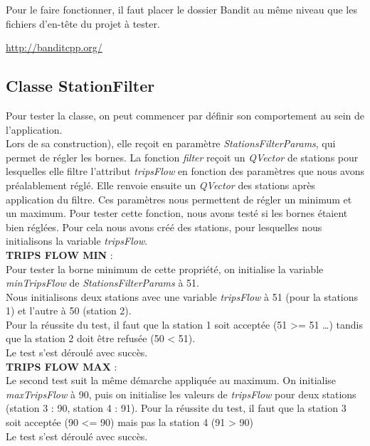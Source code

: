 \documentclass[12pt]{article}
\begin{document}
	Pour le faire fonctionner, il faut placer le dossier Bandit au même niveau que les fichiers d’en-tête du projet à tester.

	\url{http://banditcpp.org/}
	
		\subsection{Classe StationFilter}
		Pour tester la classe, on peut commencer par définir son comportement au sein de l’application.\\

		Lors de sa construction), elle reçoit en paramètre \textit{StationsFilterParams}, qui permet de régler les bornes. La fonction \textit{filter} reçoit un \textit{QVector} de stations pour lesquelles elle filtre l’attribut \textit{tripsFlow} en fonction des paramètres que nous avons préalablement réglé. Elle renvoie ensuite un \textit{QVector} des stations après application du filtre. Ces paramètres nous permettent de régler un minimum et un maximum. Pour tester cette fonction, nous avons testé si les bornes étaient bien réglées. Pour cela nous avons créé des stations, pour lesquelles nous initialisons la variable \textit{tripsFlow}.\\

		\textbf{TRIPS FLOW MIN} :\\
		Pour tester la borne minimum de cette propriété, on initialise la variable \textit{minTripsFlow} de \textit{StationsFilterParams} à 51.\\
		Nous initialisons deux stations avec une variable \textit{tripsFlow} à 51 (pour la stations 1) et l’autre à 50 (station 2).\\
		Pour la réussite du test, il faut que la station 1 soit acceptée (51 >= 51 …) tandis que la station 2 doit être refusée (50 < 51).\\

		Le test s’est déroulé avec succès.\\


		\textbf{TRIPS FLOW MAX} :\\
		Le second test suit la même démarche appliquée au maximum. On initialise \textit{maxTripsFlow} à 90, puis on initialise les valeurs de \textit{tripsFlow} pour deux stations (station 3 : 90, station 4 : 91). Pour la réussite du test, il faut que la station 3 soit acceptée (90 <= 90) mais pas la station 4 (91 > 90)\\

		Le test s’est déroulé avec succès.\\
\end{document}
